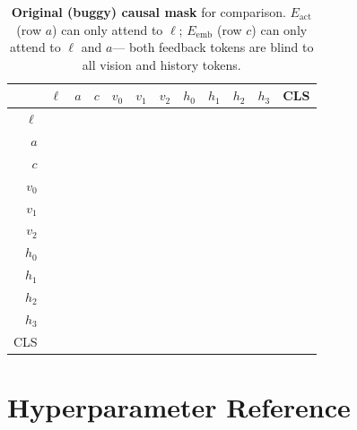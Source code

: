 \documentclass{article}
\newcommand{\cmark}{\ding{51}}
\newcommand{\xmark}{\ding{55}}
\begin{document}
\begin{table}[h]
\centering
\caption{\textbf{Original (buggy) causal mask} for comparison.
         $E_{\mathrm{act}}$ (row $a$) can only attend to $\ell$;
         $E_{\mathrm{emb}}$ (row $c$) can only attend to $\ell$ and $a$---
         both feedback tokens are blind to all vision and history tokens.}
\label{tab:mask_wrong}
\scriptsize
\setlength{\tabcolsep}{3.5pt}
\begin{tabular}{r|ccccccccccc}
\toprule
 & $\ell$ & $a$ & $c$ & $v_0$ & $v_1$ & $v_2$ & $h_0$ & $h_1$ & $h_2$ & $h_3$ & CLS \\
\midrule
$\ell$ & \cmark&\xmark&\xmark&\xmark&\xmark&\xmark&\xmark&\xmark&\xmark&\xmark&\xmark \\
$a$    & \cmark&\cmark&\xmark&\xmark&\xmark&\xmark&\xmark&\xmark&\xmark&\xmark&\xmark \\
$c$    & \cmark&\cmark&\cmark&\xmark&\xmark&\xmark&\xmark&\xmark&\xmark&\xmark&\xmark \\
$v_0$  & \cmark&\cmark&\cmark&\cmark&\xmark&\xmark&\xmark&\xmark&\xmark&\xmark&\xmark \\
$v_1$  & \cmark&\cmark&\cmark&\cmark&\cmark&\xmark&\xmark&\xmark&\xmark&\xmark&\xmark \\
$v_2$  & \cmark&\cmark&\cmark&\cmark&\cmark&\cmark&\xmark&\xmark&\xmark&\xmark&\xmark \\
$h_0$  & \cmark&\cmark&\cmark&\cmark&\cmark&\cmark&\cmark&\xmark&\xmark&\xmark&\xmark \\
$h_1$  & \cmark&\cmark&\cmark&\cmark&\cmark&\cmark&\cmark&\cmark&\xmark&\xmark&\xmark \\
$h_2$  & \cmark&\cmark&\cmark&\cmark&\cmark&\cmark&\cmark&\cmark&\cmark&\xmark&\xmark \\
$h_3$  & \cmark&\cmark&\cmark&\cmark&\cmark&\cmark&\cmark&\cmark&\cmark&\cmark&\xmark \\
CLS    & \cmark&\cmark&\cmark&\cmark&\cmark&\cmark&\cmark&\cmark&\cmark&\cmark&\cmark \\
\bottomrule
\end{tabular}
\end{table}

\section{Hyperparameter Reference}
\label{app:hparams}
\end{document}
